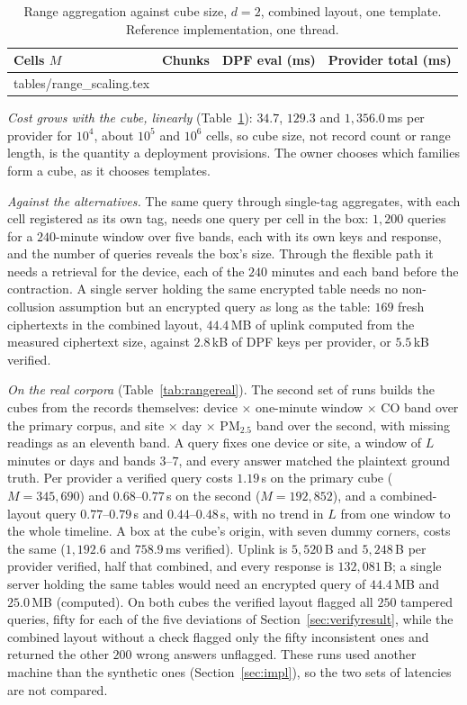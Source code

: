 \documentclass[a4paper,fleqn]{cas-sc}
\begin{document}
\begin{table}[pos=htbp]
\caption{Range aggregation against cube size, $d=2$, combined layout, one
template. Reference implementation, one thread.}
\label{tab:rangescale}
\centering
\footnotesize
\begin{tabular*}{\tblwidth}{@{\extracolsep{\fill}}lccc@{}}
\toprule
Cells $M$ & Chunks & DPF eval (ms) & Provider total (ms) \\
\midrule
{} tables/range_scaling.tex 
\bottomrule
\end{tabular*}
\end{table}

\emph{Cost grows with the cube, linearly} (Table~\ref{tab:rangescale}): $34.7$,
$129.3$ and $1{,}356.0$\,ms per provider for $10^4$, about $10^5$ and $10^6$
cells, so cube size, not record count or range length, is the quantity a
deployment provisions. The owner chooses which families form a cube, as it
chooses templates.

\emph{Against the alternatives.} The same query through single-tag aggregates,
with each cell registered as its own tag, needs one query per cell in the box:
$1{,}200$ queries for a $240$-minute window over five bands, each with its own
keys and response, and the number of queries reveals the box's size. Through
the flexible path it needs a retrieval for the device, each of the $240$
minutes and each band before the contraction. A single server holding the same
encrypted table needs no non-collusion assumption but an encrypted query as long
as the table: $169$ fresh ciphertexts in the combined layout, $44.4$\,MB of
uplink computed from the measured ciphertext size, against $2.8$\,kB of DPF
keys per provider, or $5.5$\,kB verified.

\emph{On the real corpora} (Table~\ref{tab:rangereal}). The second set of
runs builds the cubes from the records themselves: device $\times$ one-minute
window $\times$ CO band over the primary corpus, and site $\times$ day $\times$
PM$_{2.5}$ band over the second, with missing readings as an eleventh band. A
query fixes one device or site, a window of $L$ minutes or days and bands
$3$--$7$, and every answer matched the plaintext ground truth. Per provider a
verified query costs $1.19$\,s on the primary cube ($M=345{,}690$) and
$0.68$--$0.77$\,s on the second ($M=192{,}852$), and a combined-layout query
$0.77$--$0.79$\,s and $0.44$--$0.48$\,s, with no trend in $L$ from one window
to the whole timeline. A box at the cube's origin, with seven dummy corners,
costs the same ($1{,}192.6$ and $758.9$\,ms verified). Uplink is $5{,}520$\,B
and $5{,}248$\,B per provider verified, half that combined, and every response
is $132{,}081$\,B; a single server holding the same tables would need an
encrypted query of $44.4$\,MB and $25.0$\,MB (computed). On both cubes the
verified layout flagged all $250$ tampered queries, fifty for each of the five
deviations of Section~\ref{sec:verifyresult}, while the combined layout without
a check flagged only the fifty inconsistent ones and returned the other $200$
wrong answers unflagged. These runs used another machine than the synthetic
ones (Section~\ref{sec:impl}), so the two sets of latencies are not compared.
\end{document}
